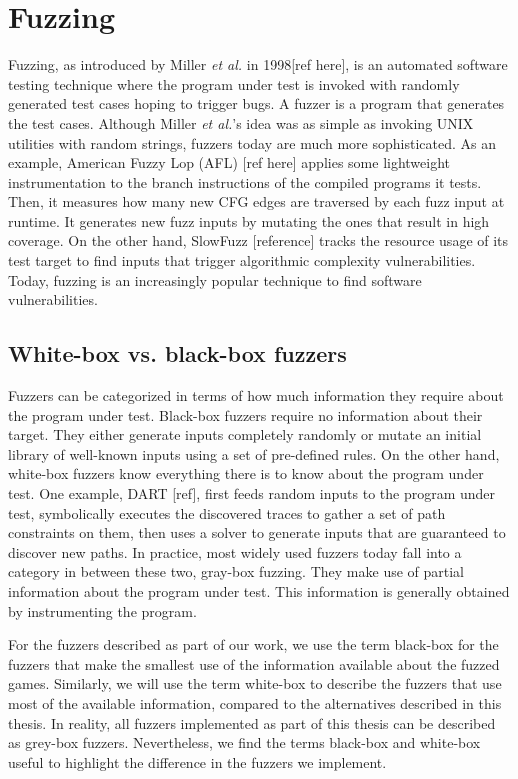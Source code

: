 \section{Fuzzing}
Fuzzing, as introduced by Miller \textit{et al.} in 1998[ref here], is an automated software testing technique where the program under test is invoked with randomly generated test cases hoping to trigger bugs.
A fuzzer is a program that generates the test cases. Although Miller \textit{et al.}'s idea was as simple as invoking UNIX utilities with random strings, fuzzers today are much more sophisticated.
As an example, American Fuzzy Lop (AFL) [ref here] applies some lightweight instrumentation to the branch instructions of the compiled programs it tests.
Then, it measures how many new CFG edges are traversed by each fuzz input at runtime.
It generates new fuzz inputs by mutating the ones that result in high coverage.
On the other hand, SlowFuzz [reference] tracks the resource usage of its test target to find inputs that trigger algorithmic complexity vulnerabilities.
Today, fuzzing is an increasingly popular technique to find software vulnerabilities.

\subsection{White-box vs. black-box fuzzers}
Fuzzers can be categorized in terms of how much information they require about the program under test.
Black-box fuzzers require no information about their target.
They either generate inputs completely randomly or mutate an initial library of well-known inputs using a set of pre-defined rules.
On the other hand, white-box fuzzers know everything there is to know about the program under test.
One example, DART [ref], first feeds random inputs to the program under test, symbolically executes the discovered traces to gather a set of path constraints on them, then uses a solver to generate inputs that are guaranteed to discover new paths.
In practice, most widely used fuzzers today fall into a category in between these two, gray-box fuzzing.
They make use of partial information about the program under test.
This information is generally obtained by instrumenting the program.

For the fuzzers described as part of our work, we use the term black-box for the fuzzers that make the smallest use of the information available about the fuzzed games.
Similarly, we will use the term white-box to describe the fuzzers that use most of the available information, compared to the alternatives described in this thesis.
In reality, all fuzzers implemented as part of this thesis can be described as grey-box fuzzers.
Nevertheless, we find the terms black-box and white-box useful to highlight the difference in the fuzzers we implement.

